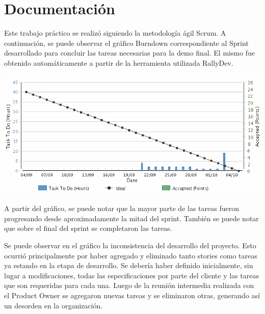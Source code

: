 \section{Documentación}

Este trabajo práctico se realizó siguiendo la metodología ágil Scrum.
A continuación, se puede observar el gráfico Burndown correspondiente al Sprint
desarrollado para concluir las tareas necesarias para la demo final.
El mismo fue obtenido automáticamente a partir de la herramienta utilizada RallyDev.
\newline


\centerline{\includegraphics[width=1\textwidth]{./imagenes/burndown.png}}



A partir del gráfico, se puede notar que la mayor parte de las tareas fueron progresando
desde aproximadamente la mitad del sprint. 
También se puede notar que sobre el final del sprint se completaron las tareas.


Se puede observar en el gráfico la inconsistencia del desarrollo del proyecto. Esto ocurrió principalmente por haber agregado y eliminado
tanto stories como tareas ya estando en la etapa de desarrollo. Se debería haber definido inicialmente, sin lugar
a modificaciones, todas las especificaciones por parte del cliente y las tareas que son requeridas para cada una.
Luego de la reunión intermedia realizada con el Product Owner se agregaron nuevas tareas y se eliminaron otras,
generando así un desorden en la organización.